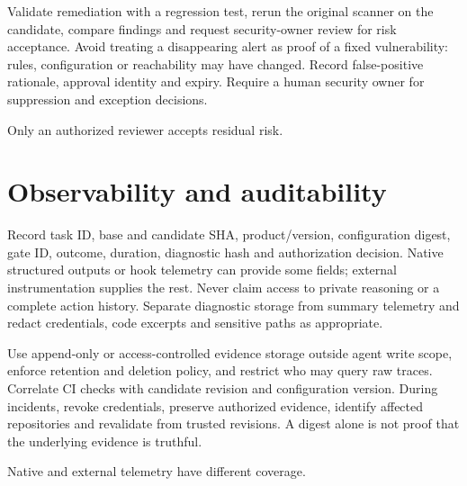 \documentclass[11pt,letterpaper]{article}
\begin{document}
Validate remediation with a regression test, rerun the original scanner on the candidate, compare findings and request security-owner review for risk acceptance. Avoid treating a disappearing alert as proof of a fixed vulnerability: rules, configuration or reachability may have changed. Record false-positive rationale, approval identity and expiry. Require a human security owner for suppression and exception decisions.

\begin{center}\begin{minipage}{\linewidth}\captionsetup{type=figure}\centering{}\caption{Application security integration}
\small Only an authorized reviewer accepts residual risk.\end{minipage}\end{center}
\section{Observability and auditability}
Record task ID, base and candidate SHA, product/version, configuration digest, gate ID, outcome, duration, diagnostic hash and authorization decision. Native structured outputs or hook telemetry can provide some fields; external instrumentation supplies the rest. Never claim access to private reasoning or a complete action history. Separate diagnostic storage from summary telemetry and redact credentials, code excerpts and sensitive paths as appropriate.

Use append-only or access-controlled evidence storage outside agent write scope, enforce retention and deletion policy, and restrict who may query raw traces. Correlate CI checks with candidate revision and configuration version. During incidents, revoke credentials, preserve authorized evidence, identify affected repositories and revalidate from trusted revisions. A digest alone is not proof that the underlying evidence is truthful.

\begin{center}\begin{minipage}{\linewidth}\captionsetup{type=figure}\centering{}\caption{Observability and evidence collection}
\small Native and external telemetry have different coverage.\end{minipage}\end{center}
\end{document}
